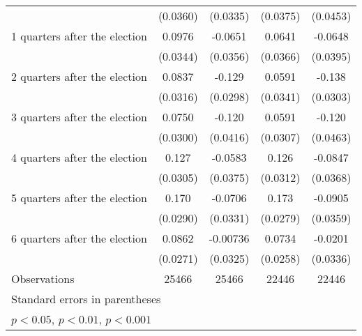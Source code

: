 \begin{table}[htbp]
\begin{tabular}{l*{4}{c}}
                    &    (0.0360)         &    (0.0335)         &    (0.0375)         &    (0.0453)         \\
[1em]
 1 quarters after the election&      0.0976\sym{**} &     -0.0651         &      0.0641         &     -0.0648         \\
                    &    (0.0344)         &    (0.0356)         &    (0.0366)         &    (0.0395)         \\
[1em]
 2 quarters after the election&      0.0837\sym{**} &      -0.129\sym{***}&      0.0591         &      -0.138\sym{***}\\
                    &    (0.0316)         &    (0.0298)         &    (0.0341)         &    (0.0303)         \\
[1em]
 3 quarters after the election&      0.0750\sym{*}  &      -0.120\sym{**} &      0.0591         &      -0.120\sym{**} \\
                    &    (0.0300)         &    (0.0416)         &    (0.0307)         &    (0.0463)         \\
[1em]
 4 quarters after the election&       0.127\sym{***}&     -0.0583         &       0.126\sym{***}&     -0.0847\sym{*}  \\
                    &    (0.0305)         &    (0.0375)         &    (0.0312)         &    (0.0368)         \\
[1em]
 5 quarters after the election&       0.170\sym{***}&     -0.0706\sym{*}  &       0.173\sym{***}&     -0.0905\sym{*}  \\
                    &    (0.0290)         &    (0.0331)         &    (0.0279)         &    (0.0359)         \\
[1em]
 6 quarters after the election&      0.0862\sym{**} &    -0.00736         &      0.0734\sym{**} &     -0.0201         \\
                    &    (0.0271)         &    (0.0325)         &    (0.0258)         &    (0.0336)         \\
\hline
Observations        &       25466         &       25466         &       22446         &       22446         \\
\hline\hline
\multicolumn{5}{l}{\footnotesize Standard errors in parentheses}\\
\multicolumn{5}{l}{\footnotesize \sym{*} \(p<0.05\), \sym{**} \(p<0.01\), \sym{***} \(p<0.001\)}\\
\end{tabular}
\end{table}
